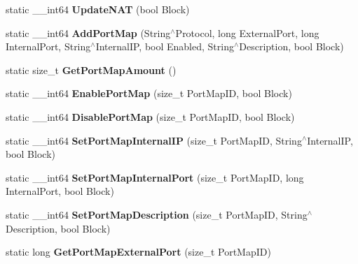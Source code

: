 \begin{DoxyCompactItemize}
\item 
\hypertarget{structmn_c_l_r_afb7ab7511f8a5684d9e9556c1089cd96}{
static \_\-\_\-int64 {\bfseries UpdateNAT} (bool Block)}
\label{structmn_c_l_r_afb7ab7511f8a5684d9e9556c1089cd96}

\item 
\hypertarget{structmn_c_l_r_ab7d0261e61f8f3a3458394b4609db878}{
static \_\-\_\-int64 {\bfseries AddPortMap} (String$^\wedge$Protocol, long ExternalPort, long InternalPort, String$^\wedge$InternalIP, bool Enabled, String$^\wedge$Description, bool Block)}
\label{structmn_c_l_r_ab7d0261e61f8f3a3458394b4609db878}

\item 
\hypertarget{structmn_c_l_r_a946f598fc1804f959407d3c363536784}{
static size\_\-t {\bfseries GetPortMapAmount} ()}
\label{structmn_c_l_r_a946f598fc1804f959407d3c363536784}

\item 
\hypertarget{structmn_c_l_r_a12c6e00c64f2fb79bbee9c75f66989ce}{
static \_\-\_\-int64 {\bfseries EnablePortMap} (size\_\-t PortMapID, bool Block)}
\label{structmn_c_l_r_a12c6e00c64f2fb79bbee9c75f66989ce}

\item 
\hypertarget{structmn_c_l_r_a3d81594530678c88a7f4a5910d5dac09}{
static \_\-\_\-int64 {\bfseries DisablePortMap} (size\_\-t PortMapID, bool Block)}
\label{structmn_c_l_r_a3d81594530678c88a7f4a5910d5dac09}

\item 
\hypertarget{structmn_c_l_r_abd73ebb61c924e36170670a4b7a8a37f}{
static \_\-\_\-int64 {\bfseries SetPortMapInternalIP} (size\_\-t PortMapID, String$^\wedge$InternalIP, bool Block)}
\label{structmn_c_l_r_abd73ebb61c924e36170670a4b7a8a37f}

\item 
\hypertarget{structmn_c_l_r_a5f903573449bfad3a45c09944fde4f7e}{
static \_\-\_\-int64 {\bfseries SetPortMapInternalPort} (size\_\-t PortMapID, long InternalPort, bool Block)}
\label{structmn_c_l_r_a5f903573449bfad3a45c09944fde4f7e}

\item 
\hypertarget{structmn_c_l_r_a28f5f6ba63e65f36379676c2aba6d1cb}{
static \_\-\_\-int64 {\bfseries SetPortMapDescription} (size\_\-t PortMapID, String$^\wedge$Description, bool Block)}
\label{structmn_c_l_r_a28f5f6ba63e65f36379676c2aba6d1cb}

\item 
\hypertarget{structmn_c_l_r_a9cdcad0b2662d11a855d145809891642}{
static long {\bfseries GetPortMapExternalPort} (size\_\-t PortMapID)}
\label{structmn_c_l_r_a9cdcad0b2662d11a855d145809891642}


\end{DoxyCompactItemize}

